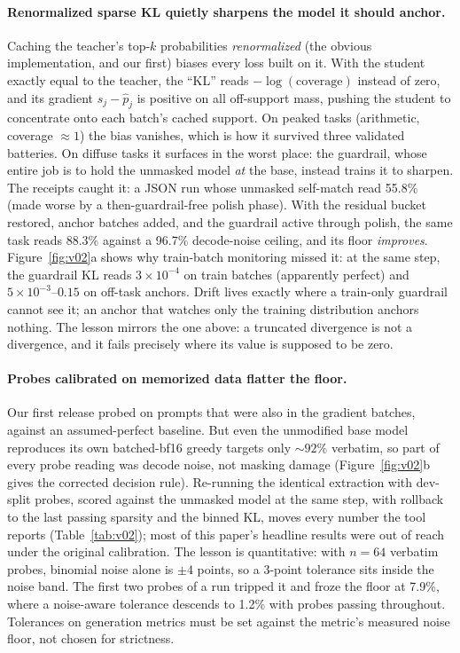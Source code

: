 \documentclass{article}
\begin{document}
\paragraph{Renormalized sparse KL quietly sharpens the model it should
anchor.} Caching the teacher's top-$k$ probabilities \emph{renormalized} (the
obvious implementation, and our first) biases every loss built on it. With
the student exactly equal to the teacher, the ``KL'' reads
$-\log(\text{coverage})$ instead of zero, and its gradient $s_j - \hat{p}_j$
is positive on all off-support mass, pushing the student to concentrate onto
each batch's cached support. On peaked tasks (arithmetic, coverage
${\approx}1$) the bias vanishes, which is how it survived three validated
batteries. On diffuse tasks it surfaces in the worst place: the guardrail,
whose entire job is to hold the unmasked model \emph{at} the base, instead
trains it to sharpen. The receipts caught it: a JSON run whose unmasked
self-match read 55.8\% (made worse by a then-guardrail-free polish phase).
With the residual bucket restored, anchor batches added, and the guardrail
active through polish, the same task reads 88.3\% against a 96.7\%
decode-noise ceiling, and its floor \emph{improves}. Figure~\ref{fig:v02}a
shows why train-batch monitoring missed it: at the same step, the guardrail KL
reads $3\times10^{-4}$ on train batches (apparently perfect) and
$5\times10^{-3}$--$0.15$ on off-task anchors. Drift lives exactly where a
train-only guardrail cannot see it; an anchor that watches only the training
distribution anchors nothing. The lesson mirrors the one above: a truncated
divergence is not a divergence, and it fails precisely where its value is
supposed to be zero.

\paragraph{Probes calibrated on memorized data flatter the floor.} Our first
release probed on prompts that were also in the gradient batches, against an
assumed-perfect baseline. But even the unmodified base model reproduces its
own batched-bf16 greedy targets only ${\sim}92\%$ verbatim, so part of every
probe reading was decode noise, not masking damage (Figure~\ref{fig:v02}b
gives the corrected decision rule). Re-running the identical extraction with
dev-split probes, scored against the unmasked model at the same step, with
rollback to the last passing sparsity and the binned KL, moves every number
the tool reports (Table~\ref{tab:v02}); most of this paper's headline results
were out of reach under the original calibration. The lesson is quantitative:
with $n{=}64$ verbatim probes, binomial noise alone is ${\pm}4$ points, so a
3-point tolerance sits inside the noise band. The first two probes of a run
tripped it and froze the floor at 7.9\%, where a noise-aware tolerance
descends to 1.2\% with probes passing throughout. Tolerances on generation
metrics must be set against the metric's measured noise floor, not chosen for
strictness.
\end{document}
